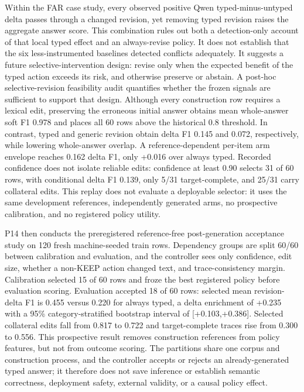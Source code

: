 \documentclass[letterpaper]{article}
\begin{document}
Within the FAR case study, every observed positive Qwen typed-minus-untyped delta passes through a changed
revision, yet removing typed revision raises the aggregate answer score. This
combination rules out both a detection-only account of that local typed effect
and an always-revise policy. It does not establish that the six less-instrumented
baselines detected conflicts adequately.
It suggests a future selective-intervention design: revise only when the
expected benefit of the typed action exceeds its risk, and otherwise preserve
or abstain. A post-hoc selective-revision feasibility audit quantifies whether
the frozen signals are sufficient to support that design. Although every construction row requires a lexical edit, preserving the erroneous initial answer obtains mean whole-answer soft F1 0.978 and places all 60 rows above the historical 0.8 threshold.
In contrast, typed and generic revision obtain delta F1 0.145 and 0.072, respectively, while lowering whole-answer overlap.
A reference-dependent per-item arm envelope reaches 0.162 delta F1, only +0.016 over always typed.
Recorded confidence does not isolate reliable edits: confidence at least 0.90 selects 31 of 60 rows, with conditional delta F1 0.139, only 5/31 target-complete, and 25/31 carry collateral edits. This replay
does not evaluate a deployable selector: it uses the same development
references, independently generated arms, no prospective calibration, and no
registered policy utility.

P14 then conducts the preregistered reference-free post-generation acceptance study on 120 fresh machine-seeded train rows. Dependency groups are split 60/60 between calibration and evaluation, and the controller sees only confidence, edit size, whether a non-KEEP action changed text, and trace-consistency margin. Calibration selected 15 of 60 rows and froze the best registered policy before evaluation scoring. Evaluation accepted 18 of 60 rows: selected mean revision-delta F1 is 0.455 versus 0.220 for always typed, a delta enrichment of +0.235 with a 95\% category-stratified bootstrap interval of [+0.103,+0.386]. Selected collateral edits fall from 0.817 to 0.722 and target-complete traces rise from 0.300 to 0.556. This prospective result removes construction references from policy features, but not from outcome scoring. The partitions share one corpus and construction process, and the controller accepts or rejects an already-generated typed answer; it therefore does not save inference or establish semantic correctness, deployment safety, external validity, or a causal policy effect.
\end{document}
